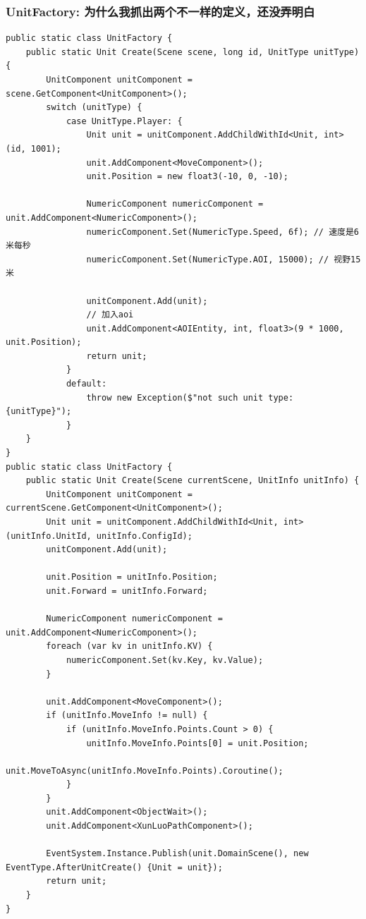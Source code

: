 \documentclass[9pt, b5paper]{article}
\begin{document}
\subsubsection{UnitFactory: 为什么我抓出两个不一样的定义，还没弄明白}
\label{sec-3-2-1}
\begin{verbatim}
public static class UnitFactory {
    public static Unit Create(Scene scene, long id, UnitType unitType) {
        UnitComponent unitComponent = scene.GetComponent<UnitComponent>();
        switch (unitType) {
            case UnitType.Player: {
                Unit unit = unitComponent.AddChildWithId<Unit, int>(id, 1001);
                unit.AddComponent<MoveComponent>();
                unit.Position = new float3(-10, 0, -10);

                NumericComponent numericComponent = unit.AddComponent<NumericComponent>();
                numericComponent.Set(NumericType.Speed, 6f); // 速度是6米每秒
                numericComponent.Set(NumericType.AOI, 15000); // 视野15米

                unitComponent.Add(unit);
                // 加入aoi
                unit.AddComponent<AOIEntity, int, float3>(9 * 1000, unit.Position);
                return unit;
            }
            default:
                throw new Exception($"not such unit type: {unitType}");
            }
    }
}
public static class UnitFactory {
    public static Unit Create(Scene currentScene, UnitInfo unitInfo) {
        UnitComponent unitComponent = currentScene.GetComponent<UnitComponent>();
        Unit unit = unitComponent.AddChildWithId<Unit, int>(unitInfo.UnitId, unitInfo.ConfigId);
        unitComponent.Add(unit);

        unit.Position = unitInfo.Position;
        unit.Forward = unitInfo.Forward;

        NumericComponent numericComponent = unit.AddComponent<NumericComponent>();
        foreach (var kv in unitInfo.KV) {
            numericComponent.Set(kv.Key, kv.Value);
        }

        unit.AddComponent<MoveComponent>();
        if (unitInfo.MoveInfo != null) {
            if (unitInfo.MoveInfo.Points.Count > 0) {
                unitInfo.MoveInfo.Points[0] = unit.Position;
                unit.MoveToAsync(unitInfo.MoveInfo.Points).Coroutine();
            }
        }
        unit.AddComponent<ObjectWait>();
        unit.AddComponent<XunLuoPathComponent>();

        EventSystem.Instance.Publish(unit.DomainScene(), new EventType.AfterUnitCreate() {Unit = unit});
        return unit;
    }
}
\end{verbatim}
\end{document}
